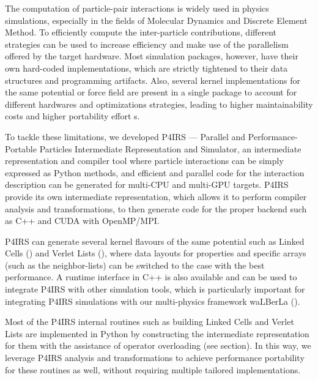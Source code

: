 \documentclass[Afour,sageh,times]{sagej}
\newcommand{\RMchange}[1]{{\color{blue} #1}}
\begin{document}
The computation of particle-pair interactions is widely used in physics simulations, especially in the fields of Molecular Dynamics and Discrete Element Method.
To efficiently compute the inter-particle contributions, different strategies can be used to increase efficiency and make use of the parallelism offered by the target hardware.
Most simulation packages, however, have their own hard-coded implementations, which are strictly tightened to their data structures and programming artifacts.
Also, several kernel implementations for the same potential or force field are present in a single package to account for different hardwares and optimizations strategies, leading to higher maintainability costs and higher portability effort\RMchange{s}.

To tackle these limitations, we developed P4IRS --- Parallel and Performance-Portable Particles Intermediate Representation and Simulator, an intermediate representation and compiler tool where particle interactions can be simply expressed as Python methods, and efficient and parallel code for the interaction description can be generated for multi-CPU and multi-GPU targets.
P4IRS provide its own intermediate representation, which allows it to perform compiler analysis and transformations, to then generate code for the proper backend such as C++ and CUDA with OpenMP/MPI.

P4IRS can generate several kernel flavours of the same potential such as Linked Cells (\cite{linkedcells}) and Verlet Lists (\cite{verletlists}), where data layouts for properties and specific arrays (such as the neighbor-lists) can be switched to the case with \RMchange{the} best performance.
A runtime interface in C++ is also available and can be used to integrate P4IRS with other simulation tools, which is particularly important for integrating P4IRS simulations with our multi-physics framework waLBerLa (\cite{walberla1,walberla2}).

Most of \RMchange{the} P4IRS internal routines such as building Linked Cells and Verlet Lists are implemented in Python by constructing the intermediate representation for them with the assistance of operator overloading (see  section).
In this way, we leverage P4IRS analysis and transformations to achieve performance portability for these routines as well, without requiring multiple tailored implementations.
\end{document}
